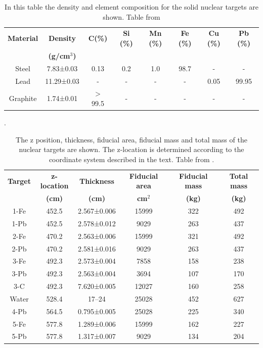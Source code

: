 \begin{itemize}
    \begin{table}[!htb]
        \centering
        \begin{tabular}{c c c c c c c c}
            \textbf{Material} & \textbf{Density} & \textbf{C(\%)} & \textbf{Si (\%)} & \textbf{Mn (\%)} & \textbf{Fe (\%)} & \textbf{Cu (\%)} & \textbf{Pb (\%)} \\ 
             & \textbf{(g/cm$^3$)} & & & & & & \\ \hline
            Steel & 7.83±0.03 & 0.13 & 0.2 & 1.0 & 98.7 & - & - \\
            Lead & 11.29±0.03 & - & - & - & - & 0.05 & 99.95\\
            Graphite & 1.74±0.01 & $>$ 99.5 & - & - & - & - & - \\ \hline
        \end{tabular}
        \caption{In this table the density and element composition for the solid nuclear targets are shown. Table from \cite{MINERvA}}.
        \label{tab:Chapter2:Detector:NuclearTargetsComposition}
    \end{table}

    \begin{table}[!htb]
        \centering
        \begin{tabular}{c c c c c c}
            \textbf{Target} & \textbf{z-location} & \textbf{Thickness} & \textbf{Fiducial area} & \textbf{Fiducial mass} & \textbf{Total mass}  \\ 
             & \textbf{(cm)} & \textbf{(cm)} & \textbf{cm$^2$} & \textbf{(kg)} & \textbf{(kg)} \\ \hline
            1-Fe & 452.5 & 2.567±0.006 & 15999 & 322 & 492 \\ 
            1-Pb & 452.5 & 2.578±0.012 & 9029 & 263 & 437 \\
            2-Fe & 470.2 & 2.563±0.006 & 15999 & 321 & 492 \\ 
            2-Pb & 470.2 & 	2.581±0.016 & 9029 & 263 & 437 \\
            3-Fe & 492.3 & 	2.573±0.004 & 7858 & 158 & 238 \\ 
            3-Pb & 492.3 & 2.563±0.004 & 3694 & 107 & 170 \\
            3-C & 492.3 & 7.620±0.005 & 12027 & 160 & 258 \\ 
            Water & 528.4 & 17–24 & 25028 & 452 & 627 \\
            4-Pb & 564.5 & 0.795±0.005 & 25028 & 225 & 340 \\
            5-Fe & 577.8 & 1.289±0.006 & 15999 & 162 & 227 \\ 
            5-Pb & 577.8 & 1.317±0.007 & 9029 & 134 & 204 \\ \hline
        \end{tabular}
        \caption{The z position, thickness, fiducial area, fiducial mass and total mass of the nuclear targets are shown. The z-location is determined according to the coordinate system described in the text. Table from \cite{MINERvA}. }
        \label{tab:Chapter2:Detector:Sizes}
    \end{table}


\end{itemize}
